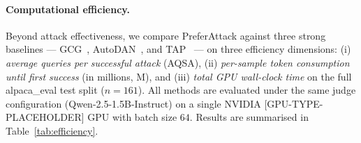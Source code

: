 
\paragraph{Computational efficiency.}
Beyond attack effectiveness, we compare PreferAttack against three
strong baselines — GCG~\cite{zou2023gcg}, AutoDAN~\cite{liu2024autodan},
and TAP~\cite{mehrotra2023tap} — on three efficiency dimensions:
(i) \emph{average queries per successful attack} (AQSA),
(ii) \emph{per-sample token consumption until first success} (in
millions, M), and (iii) \emph{total GPU wall-clock time} on the full
alpaca\_eval test split ($n{=}161$).
All methods are evaluated under the same judge configuration
(Qwen-2.5-1.5B-Instruct) on a single NVIDIA [GPU-TYPE-PLACEHOLDER]
GPU with batch size $64$. Results are summarised in
Table~\ref{tab:efficiency}.

